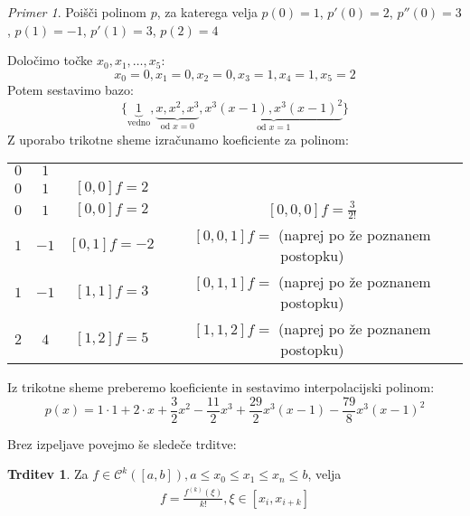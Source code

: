 \documentclass[a4paper,12pt]{article}
\theoremstyle{definition}
\newtheorem{claim}[counter]{Trditev}
\theoremstyle{remark}
\newtheorem*{ex}{Primer}
\begin{document}
\begin{ex}
    Poišči polinom $p$, za katerega velja $p(0) = 1$, $p'(0) = 2$, $p''(0) = 3$, $p(1) = -1$, $p'(1) = 3$, $p(2) = 4$

    Določimo točke $x_0, x_1, \dots, x_5$:
    \begin{equation*}
        x_0 = 0, x_1 = 0, x_2 = 0, x_3 = 1, x_4 = 1, x_5 = 2
    \end{equation*}
    Potem sestavimo bazo:
    \begin{equation*}
        \{\underbrace{1}_{\text{vedno}}, \underbrace{x, x^2, x^3}_{\text{od }x=0}, \underbrace{x^3(x-1), x^3(x-1)^2}_{\text{od } x=1}\}
    \end{equation*}
    Z uporabo trikotne sheme izračunamo koeficiente za polinom:
    
    \begin{center}
        \begin{tabular}{c|c c c}
            $0$ & $1$ \\
            $0$ & $1$  & $[0, 0]f = 2$\\
            $0$ & $1$  & $[0, 0]f = 2$ & $[0, 0, 0]f = \frac{3}{2!}$ \\
            $1$ & $-1$ & $[0, 1]f =-2$ & $[0, 0, 1]f =$ (naprej po že poznanem postopku)\\
            $1$ & $-1$ & $[1, 1]f = 3$ & $[0, 1, 1]f =$ (naprej po že poznanem postopku)\\
            $2$ & $4$  & $[1, 2]f = 5$ & $[1, 1, 2]f =$ (naprej po že poznanem postopku)
            
        \end{tabular}
    \end{center}

    Iz trikotne sheme preberemo koeficiente in sestavimo interpolacijski polinom:
    \begin{equation*}
        p(x) = 1 \cdot 1 + 2 \cdot x + \frac{3}{2} x^2 - \frac{11}{2}x^3 + \frac{29}{2}x^3(x-1) - \frac{79}{8} x^3(x-1)^2
    \end{equation*}
\end{ex}

Brez izpeljave povejmo še sledeče trditve:
\begin{claim}
    Za $f \in \mathscr{C}^k ([a, b]), a \leq x_0 \leq x_1 \leq x_n \leq b$, velja
    \begin{align*}
        [x_i, x_{i+1}, \dots, x_{i+k}] f = \frac{f^{(k)}(\xi)}{k!}, \xi \in [x_i, x_{i+k}]
    \end{align*}
\end{claim}
\end{document}
